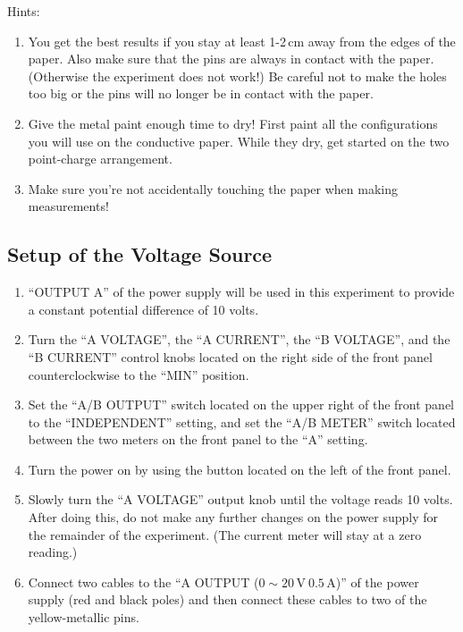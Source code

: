 \myskip
\noindent Hints:
\begin{enumerate}
    \item You get the best results if you stay at least 1-2$\,\mathrm{cm}$ away from the edges of the paper. Also make sure that the pins are always in contact with the paper. (Otherwise the experiment does not work!) Be careful not to make the holes too big or the pins will no longer be in contact with the paper.
    \item Give the metal paint enough time to dry! First paint all the configurations you will use on the conductive paper. While they dry, get started on the two point-charge arrangement.
    \item Make sure you're not accidentally touching the paper when making measurements!
\end{enumerate}

\subsection{Setup of the Voltage Source}

\begin{enumerate}
    \item ``OUTPUT A'' of the power supply will be used in this experiment to provide a constant potential difference of 10 volts.
    \item Turn the ``A VOLTAGE'', the ``A CURRENT'', the ``B VOLTAGE'', and the ``B CURRENT'' control knobs located on the right side of the front panel counterclockwise to the ``MIN'' position.
    \item Set the ``A/B OUTPUT'' switch located on the upper right of the front panel to the ``INDEPENDENT'' setting, and set the ``A/B METER'' switch located between the two meters on the front panel to the ``A'' setting.
    \item Turn the power on by using the button located on the left of the front panel.
    \item Slowly turn the ``A VOLTAGE'' output knob until the voltage reads 10 volts. After doing this, do not make any further changes on the power supply for the remainder of the experiment. (The current meter will stay at a zero reading.)
    \item Connect two cables to the ``A OUTPUT ($0\sim 20\,\mathrm{V}\  0.5\,\mathrm{A}$)'' of the power supply (red and black poles) and then connect these cables to two of the yellow-metallic pins.
\end{enumerate}

